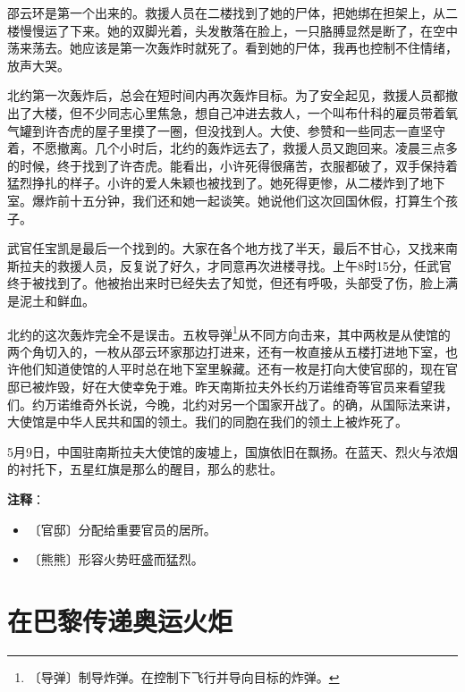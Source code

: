 \documentclass[12pt,UTF-8,openany]{ctexbook}
\begin{document}
\begin{Large}
    邵云环是第一个出来的。救援人员在二楼找到了她的尸体，把她绑在担架上，从二楼慢慢运了下来。她的双脚光着，头发散落在脸上，一只胳膊显然是断了，在空中荡来荡去。她应该是第一次轰炸时就死了。看到她的尸体，我再也控制不住情绪，放声大哭。
    
    北约第一次轰炸后，总会在短时间内再次轰炸目标。为了安全起见，救援人员都撤出了大楼，但不少同志心里焦急，想自己冲进去救人，一个叫布什科的雇员带着氧气罐到许杏虎的屋子里摸了一圈，但没找到人。大使、参赞和一些同志一直坚守着，不愿撤离。几个小时后，北约的轰炸远去了，救援人员又跑回来。凌晨三点多的时候，终于找到了许杏虎。能看出，小许死得很痛苦，衣服都破了，双手保持着猛烈挣扎的样子。小许的爱人朱颖也被找到了。她死得更惨，从二楼炸到了地下室。爆炸前十五分钟，我们还和她一起谈笑。她说他们这次回国休假，打算生个孩子。
    
    武官任宝凯是最后一个找到的。大家在各个地方找了半天，最后不甘心，又找来南斯拉夫的救援人员，反复说了好久，才同意再次进楼寻找。上午8时15分，任武官终于被找到了。他被抬出来时已经失去了知觉，但还有呼吸，头部受了伤，脸上满是泥土和鲜血。
    
    北约的这次轰炸完全不是误击。五枚导弹\footnote{〔导弹〕制导炸弹。在控制下飞行并导向目标的炸弹。}从不同方向击来，其中两枚是从使馆的两个角切入的，一枚从邵云环家那边打进来，还有一枚直接从五楼打进地下室，也许他们知道使馆的人平时总在地下室里躲藏。还有一枚是打向大使官邸的，现在官邸已被炸毁，好在大使幸免于难。昨天南斯拉夫外长约万诺维奇等官员来看望我们。约万诺维奇外长说，今晚，北约对另一个国家开战了。的确，从国际法来讲，大使馆是中华人民共和国的领土。我们的同胞在我们的领土上被炸死了。
    
    5月9日，中国驻南斯拉夫大使馆的废墟上，国旗依旧在飘扬。在蓝天、烈火与浓烟的衬托下，五星红旗是那么的醒目，那么的悲壮。
    
\end{Large}


\newpage

\textbf{注释}：

\vspace{-1em}

\begin{itemize}
    \setlength\itemsep{-0.2em}
    \item 〔官邸〕分配给重要官员的居所。
    \item 〔熊熊〕形容火势旺盛而猛烈。
\end{itemize}

\chapter{在巴黎传递奥运火炬}
\end{document}
